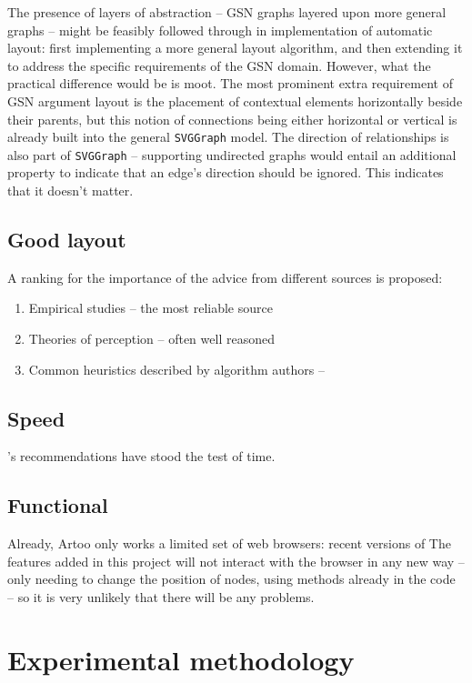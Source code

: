 The presence of layers of abstraction -- GSN graphs layered upon more general graphs -- might be feasibly followed through in implementation of automatic layout: first implementing a more general layout algorithm, and then  extending it to address the specific requirements of the GSN domain. However, what the practical difference would be is moot. The most prominent extra requirement of GSN argument layout is the placement of contextual elements horizontally beside their parents, but this notion of connections being either horizontal or vertical is already built into the general {\tt SVGGraph} model. The direction of relationships is also part of {\tt SVGGraph} -- supporting undirected graphs would entail an additional property to indicate that an edge's direction should be ignored. This indicates that it doesn't matter.

\subsection{Good layout}

A ranking for the importance of the advice from different sources is proposed:

\begin{enumerate}
\item Empirical studies -- the most reliable source
\item Theories of perception -- often well reasoned
\item Common heuristics described by algorithm authors -- 
\end{enumerate}

\subsection{Speed}

\citet{Miller:1968:RTM:1476589.1476628}'s recommendations have stood the test of time. 


\subsection{Functional}

Already, Artoo only works a limited set of web browsers: recent versions of 
The features added in this project will not interact with the browser in any new way -- only needing to change the position of nodes, using methods already in the code -- so it is very unlikely that there will be any problems.


\section{Experimental methodology}

